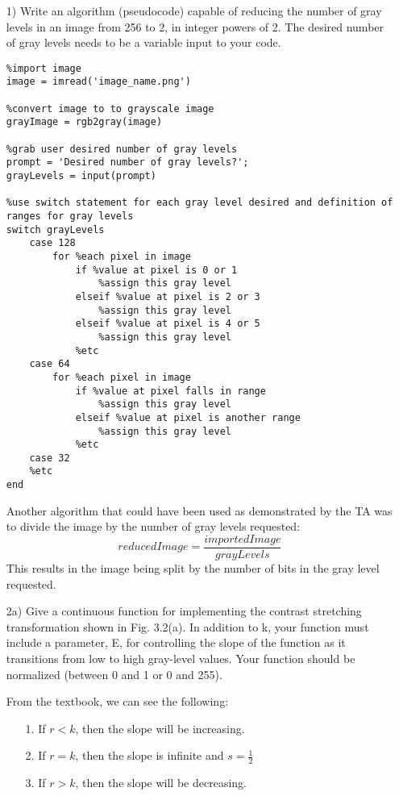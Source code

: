 \documentclass{article}
\begin{document}
\begin{enumerate}
\item[1)] Write an algorithm (pseudocode) capable of reducing the number of
gray levels in an image from 256 to 2, in integer powers of 2. The desired
number of gray levels needs to be a variable input to your code.
\begin{lstlisting}
%import image
image = imread('image_name.png')

%convert image to to grayscale image
grayImage = rgb2gray(image)

%grab user desired number of gray levels
prompt = 'Desired number of gray levels?';
grayLevels = input(prompt)

%use switch statement for each gray level desired and definition of ranges for gray levels
switch grayLevels
	case 128
		for %each pixel in image
			if %value at pixel is 0 or 1
				%assign this gray level
			elseif %value at pixel is 2 or 3
				%assign this gray level
			elseif %value at pixel is 4 or 5
				%assign this gray level
			%etc
	case 64
		for %each pixel in image
			if %value at pixel falls in range
				%assign this gray level
			elseif %value at pixel is another range
				%assign this gray level
			%etc
	case 32
	%etc
end

\end{lstlisting}

Another algorithm that could have been used as demonstrated by the TA was to divide the image by the number
of gray levels requested:
\begin{equation}
reducedImage = \frac{importedImage}{grayLevels}
\end{equation}
This results in the image being split by the number of bits in the gray level requested.

\item[2a)] Give a continuous function for implementing the contrast stretching
transformation shown in Fig. 3.2(a). In addition to k, your function
must include a parameter, E, for controlling the slope of the function as
it transitions from low to high gray-level values. Your function should be
normalized (between 0 and 1 or 0 and 255).

From the textbook, we can see the following:
\begin{enumerate}
\item[1.] If $r<k$, then the slope will be increasing.
\item[2.] If $r=k$, then the slope is infinite and $s = \frac{1}{2}$
\item[3.] If $r>k$, then the slope will be decreasing.
\end{enumerate}


\end{enumerate}
\end{document}
